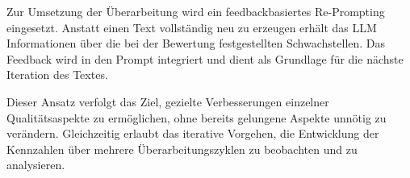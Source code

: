 
Zur Umsetzung der Überarbeitung wird ein feedbackbasiertes Re-Prompting eingesetzt.
Anstatt einen Text vollständig neu zu erzeugen erhält das LLM Informationen über die bei der Bewertung festgestellten Schwachstellen.
Das Feedback wird in den Prompt integriert und dient als Grundlage für die nächste Iteration des Textes.

Dieser Ansatz verfolgt das Ziel, gezielte Verbesserungen einzelner Qualitätsaspekte zu ermöglichen, ohne bereits gelungene Aspekte unnötig zu verändern.
Gleichzeitig erlaubt das iterative Vorgehen, die Entwicklung der Kennzahlen über mehrere Überarbeitungszyklen zu beobachten und zu analysieren.